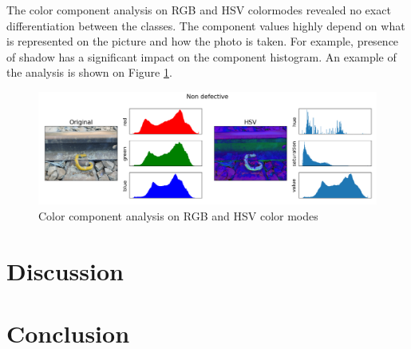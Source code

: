 \documentclass[10pt, final]{article}
\begin{document}
			The color component analysis on RGB and HSV colormodes revealed no exact differentiation between the classes.
			The component values highly depend on what is represented on the picture and how the photo is taken.
			For example, presence of shadow has a significant impact on the component histogram.
			An example of the analysis is shown on Figure \ref{fig:color_analysis}.
			\begin{figure}[!ht]
				\centering
				\includegraphics[width=\textwidth]{./tex_graphs/comp_analysis_1.png}
				\caption{Color component analysis on RGB and HSV color modes}
				\label{fig:color_analysis}
			\end{figure}
	\section{Discussion} \label{sec:discussion}
	\section{Conclusion} \label{sec:conclusion}
	\listoffigures
	\listoftables
	\printbibliography
\end{document}
